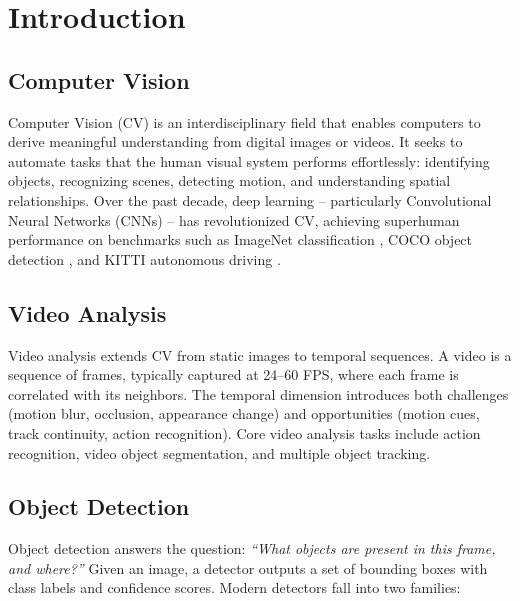 \chapter{Introduction}
\label{ch:introduction}

\section{Computer Vision}
\label{sec:cv}

Computer Vision (CV) is an interdisciplinary field that enables computers to derive meaningful understanding from digital images or videos. It seeks to automate tasks that the human visual system performs effortlessly: identifying objects, recognizing scenes, detecting motion, and understanding spatial relationships. Over the past decade, deep learning -- particularly Convolutional Neural Networks (CNNs) -- has revolutionized CV, achieving superhuman performance on benchmarks such as ImageNet classification \cite{russakovsky2015imagenet}, COCO object detection \cite{lin2014coco}, and KITTI autonomous driving \cite{geiger2012kitti}.

\section{Video Analysis}
\label{sec:video-analysis}

Video analysis extends CV from static images to temporal sequences. A video is a sequence of frames, typically captured at 24--60 FPS, where each frame is correlated with its neighbors. The temporal dimension introduces both challenges (motion blur, occlusion, appearance change) and opportunities (motion cues, track continuity, action recognition). Core video analysis tasks include action recognition, video object segmentation, and multiple object tracking.

\section{Object Detection}
\label{sec:object-detection}

Object detection answers the question: \textit{``What objects are present in this frame, and where?''} Given an image, a detector outputs a set of bounding boxes with class labels and confidence scores. Modern detectors fall into two families:

